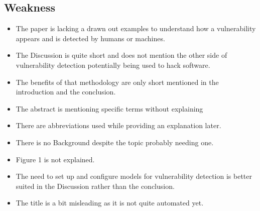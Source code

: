 \documentclass[peerreview, 10pt, onecolumn]{IEEEtran}
\begin{document}
\subsection*{Weakness}
    \begin{itemize}
        \renewcommand\labelitemi{-}
        \item The paper is lacking a drawn out examples to understand how a vulnerability appears and is detected by humans or machines.
        \item The Discussion is quite short and does not mention the other side of vulnerability detection potentially being used to hack software.
        \item The benefits of that methodology are only short mentioned in the introduction and the conclusion.
        \item The abstract is mentioning specific terms without explaining 
        \item There are abbreviations used while providing an explanation later.
        \item There is no Background despite the topic probably needing one.
        \item Figure 1 is not explained.
        \item The need to set up and configure models for vulnerability detection is better suited in the Discussion rather than the conclusion.
        \item The title is a bit misleading as it is not quite automated yet.
    \end{itemize}
\end{document}
